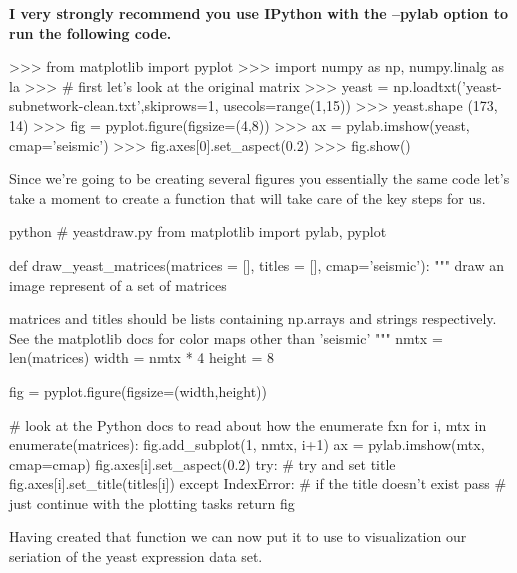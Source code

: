 \documentclass[11pt,letterpaper]{article}
\begin{document}
{\color{red} \bfseries I very strongly recommend you use IPython with the --pylab option to run the following code.}

\begin{Pcode}
>>> from matplotlib import pyplot
>>> import numpy as np, numpy.linalg as la
>>> # first let's look at the original matrix
>>> yeast = np.loadtxt('yeast-subnetwork-clean.txt',skiprows=1, usecols=range(1,15))
>>> yeast.shape
(173, 14)
>>> fig = pyplot.figure(figsize=(4,8))
>>> ax = pylab.imshow(yeast, cmap='seismic')
>>> fig.axes[0].set_aspect(0.2)
>>> fig.show() 
\end{Pcode}

Since we're going to be creating several figures you essentially the same code let's take a moment to create a function that will take care of the key steps for us.

\begin{PageCode}{python}
# yeastdraw.py
from matplotlib import pylab, pyplot

def draw_yeast_matrices(matrices = [], titles = [], cmap='seismic'):
    """ draw an image represent of a set of matrices
    
    matrices and titles should be lists containing np.arrays and strings
    respectively. See the matplotlib docs for color maps other than 'seismic'
    """
    nmtx = len(matrices)
    width = nmtx * 4
    height = 8
    
    fig = pyplot.figure(figsize=(width,height))
    
    # look at the Python docs to read about how the enumerate fxn
    for i, mtx in enumerate(matrices):
        fig.add_subplot(1, nmtx, i+1)
        ax = pylab.imshow(mtx, cmap=cmap)
        fig.axes[i].set_aspect(0.2)
        try:  # try and set title
            fig.axes[i].set_title(titles[i])
        except IndexError:  # if the title doesn't exist
            pass            # just continue with the plotting tasks
    return fig
    
\end{PageCode}

Having created that function we can now put it to use to visualization our seriation of the yeast expression data set.
\end{document}
